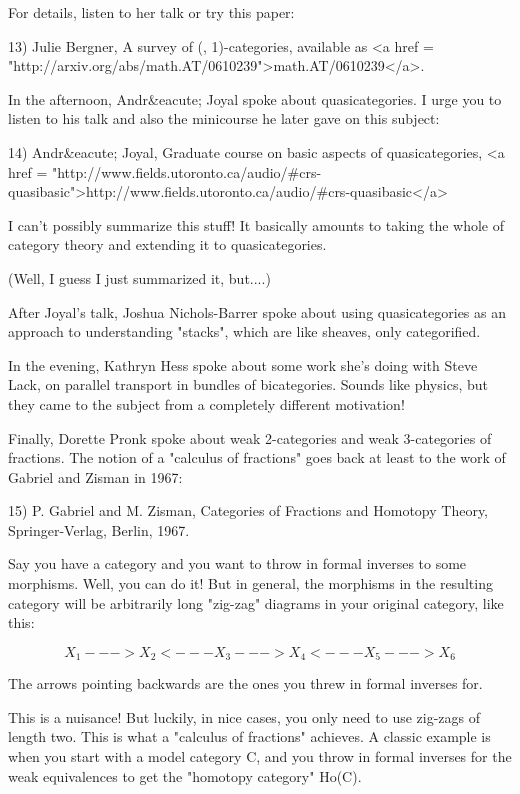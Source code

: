 For details, listen to her talk or try this paper:

13) Julie Bergner, A survey of (\infty , 1)-categories,
available as <a href = "http://arxiv.org/abs/math.AT/0610239">math.AT/0610239</a>.

In the afternoon, Andr&eacute; Joyal spoke about quasicategories.
I urge you to listen to his talk and also the minicourse he
later gave on this subject:

14) Andr&eacute; Joyal, Graduate course on basic aspects of 
quasicategories, <a href = "http://www.fields.utoronto.ca/audio/#crs-quasibasic">http://www.fields.utoronto.ca/audio/#crs-quasibasic</a>

I can't possibly summarize this stuff!  It basically amounts to
taking the whole of category theory and extending it to 
quasicategories.  

(Well, I guess I just summarized it, but....)

After Joyal's talk, Joshua Nichols-Barrer spoke about using
quasicategories as an approach to understanding "stacks",
which are like sheaves, only categorified.

In the evening, Kathryn Hess spoke about some work she's doing
with Steve Lack, on parallel transport in bundles of bicategories.
Sounds like physics, but they came to the subject from a completely
different motivation!

Finally, Dorette Pronk spoke about weak 2-categories and weak
3-categories of fractions.  The notion of a "calculus of
fractions" goes back at least to the work of Gabriel and Zisman
in 1967:

15) P. Gabriel and M. Zisman, Categories of Fractions and Homotopy 
Theory, Springer-Verlag, Berlin, 1967.

Say you have a category and you want to throw in formal inverses to 
some morphisms.  Well, you can do it!  But in general, the morphisms 
in the resulting category will be arbitrarily long "zig-zag" 
diagrams in your original category, like this:

$$
X_{1} ---> X_{2} <--- X_{3} ---> X_{4} <--- X_{5} ---> X_{6}
$$
    
The arrows pointing backwards are the ones you threw in formal 
inverses for.  

This is a nuisance!  But luckily, in nice cases, you only need to use
zig-zags of length two.  This is what a "calculus of
fractions" achieves.  A classic example is when you start with a
model category C, and you throw in formal inverses for the weak
equivalences to get the "homotopy category" Ho(C).

